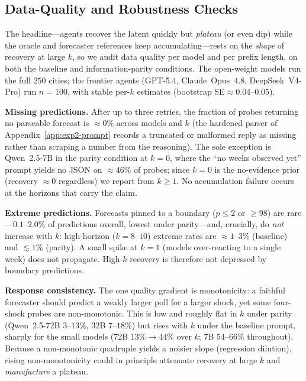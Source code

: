 \subsection{Data-Quality and Robustness Checks}
\label{app:exp2-robustness}

The headline---agents recover the latent quickly but \emph{plateau} (or even dip) while the oracle
and forecaster references keep accumulating---rests on the \emph{shape} of recovery at large $k$, so
we audit data quality per model and per prefix length, on both the baseline and information-parity
conditions.  The open-weight models run the full $250$ cities; the frontier agents (GPT-5.4,
Claude~Opus~4.8, DeepSeek~V4-Pro) run $n{=}100$, with stable per-$k$ estimates (bootstrap
SE${\approx}0.04$--$0.05$).

\textbf{Missing predictions.}  After up to three retries, the fraction of probes returning no
parseable forecast is $\approx0\%$ across models and $k$ (the hardened parser of
Appendix~\ref{app:exp2-prompt} records a truncated or malformed reply as missing rather than
scraping a number from the reasoning).  The sole exception is Qwen~2.5-7B in the parity condition at
$k=0$, where the ``no weeks observed yet'' prompt yields no JSON on $\approx46\%$ of probes; since
$k=0$ is the no-evidence prior (recovery $\approx0$ regardless) we report from $k\geq1$.  No
accumulation failure occurs at the horizons that carry the claim.

\textbf{Extreme predictions.}  Forecasts pinned to a boundary ($\hat p\leq2$ or $\geq98$) are
rare---$0.1$--$2.0\%$ of predictions overall, lowest under parity---and, crucially, do \emph{not}
increase with $k$: high-horizon ($k=8$--$10$) extreme rates are $\approx1$--$3\%$ (baseline) and
$\lesssim1\%$ (parity).  A small spike at $k=1$ (models over-reacting to a single week) does not
propagate.  High-$k$ recovery is therefore not depressed by boundary predictions.

\textbf{Response consistency.}  The one quality gradient is monotonicity: a faithful forecaster
should predict a weakly larger poll for a larger shock, yet some four-shock probes are
non-monotonic.  This is low and roughly flat in $k$ under parity (Qwen~2.5-72B $3$--$13\%$, 32B
$7$--$18\%$) but rises with $k$ under the baseline prompt, sharply for the small models (72B
$13\%\!\to\!44\%$ over $k$; 7B $54$--$66\%$ throughout).  Because a non-monotonic quadruple yields a
noisier slope (regression dilution), rising non-monotonicity could in principle attenuate recovery
at large $k$ and \emph{manufacture} a plateau.

